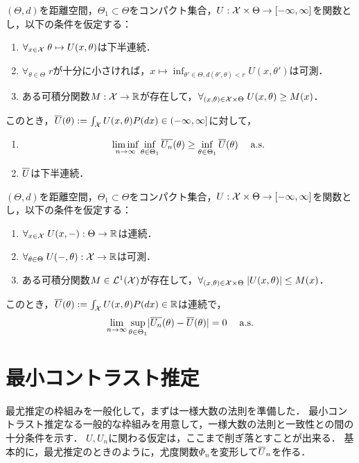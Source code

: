 \documentclass[uplatex,dvipdfmx]{jsreport}
\begin{document}
\begin{lemma}
    $(\Theta,d)$を距離空間，$\Theta_1\subset\Theta$をコンパクト集合，$U:\mathcal{X}\times\Theta\to[-\infty,\infty]$を関数とし，以下の条件を仮定する：
    \begin{enumerate}[({A}1)]
        \item $\forall_{x\in\mathcal{X}}\;\theta\mapsto U(x,\theta)$は下半連続．
        \item $\forall_{\theta\in\Theta}\;r$が十分に小さければ，$x\mapsto\inf_{\theta'\in\Theta,d(\theta',\theta)<r}U(x,\theta')$は可測．
        \item ある可積分関数$M:\mathcal{X}\to\mathbb{R}$が存在して，$\forall_{(x,\theta)\in\mathcal{X}\times\Theta}\;U(x,\theta)\ge M(x)$．
    \end{enumerate}
    このとき，$\overline{U}(\theta):=\int_{\mathcal{X}} U(x,\theta)P(dx)\in(-\infty,\infty]$に対して，
    \begin{enumerate}
        \item 
        \[\liminf_{n\to\infty}\inf_{\theta\in\Theta_1}\overline{U_n}(\theta)\ge\inf_{\theta\in\Theta_1}\overline{U}(\theta)\quad\;\mathrm{a.s.}\]
        \item $\overline{U}$は下半連続．
    \end{enumerate}
\end{lemma}

\begin{theorem}[一様大数の法則]
    $(\Theta,d)$を距離空間，$\Theta_1\subset\Theta$をコンパクト集合，$U:\mathcal{X}\times\Theta\to[-\infty,\infty]$を関数とし，以下の条件を仮定する：
    \begin{enumerate}[({A}1)]
        \item $\forall_{x\in\mathcal{X}}\;U(x,-):\Theta\to\mathbb{R}$は連続．
        \item $\forall_{\theta\in\Theta}\;U(-,\theta):\mathcal{X}\to\mathbb{R}$は可測．
        \item ある可積分関数$M\in\mathcal{L}^1(\mathcal{X})$が存在して，$\forall_{(x,\theta)\in\mathcal{X}\times\Theta}\;\lvert U(x,\theta)\rvert\le M(x)$．
    \end{enumerate}
    このとき，$\overline{U}(\theta):=\int_{\mathcal{X}} U(x,\theta)P(dx)\in\mathbb{R}$は連続で，
    \[\lim_{n\to\infty}\sup_{\theta\in\Theta_1}\lvert\overline{U_n}(\theta)-\overline{U}(\theta)\rvert=0\quad\;\mathrm{a.s.}\]
\end{theorem}

\section{最小コントラスト推定}

\begin{tcolorbox}[colframe=ForestGreen, colback=ForestGreen!10!white,breakable,colbacktitle=ForestGreen!40!white,coltitle=black,fonttitle=\bfseries\sffamily,
title=]
    最尤推定の枠組みを一般化して，まずは一様大数の法則を準備した．
    最小コントラスト推定なる一般的な枠組みを用意して，一様大数の法則と一致性との間の十分条件を示す．
    $U,U_n$に関わる仮定は，ここまで削ぎ落とすことが出来る．
    基本的に，最尤推定のときのように，尤度関数$\Phi_n$を変形して$\overline{U}_n$を作る．
\end{tcolorbox}
\end{document}
